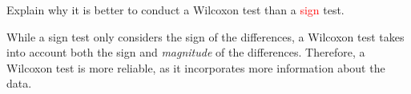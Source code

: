 \documentclass[../Notes.tex]{subfiles}
\begin{document}
\begin{note}
  Explain why it is better to conduct a \textcolor{green!70!black}{Wilcoxon} test than a \textcolor{red}{sign} test.
  \begin{center}
    \parbox{0.9\textwidth}{
     While a sign test only considers the sign of the differences, a Wilcoxon test takes into account both the sign and \emph{magnitude} of the differences. Therefore, a Wilcoxon test is more reliable, as it incorporates more information about the data.
    }
  \end{center}
      
\end{note}
      
\end{document}
